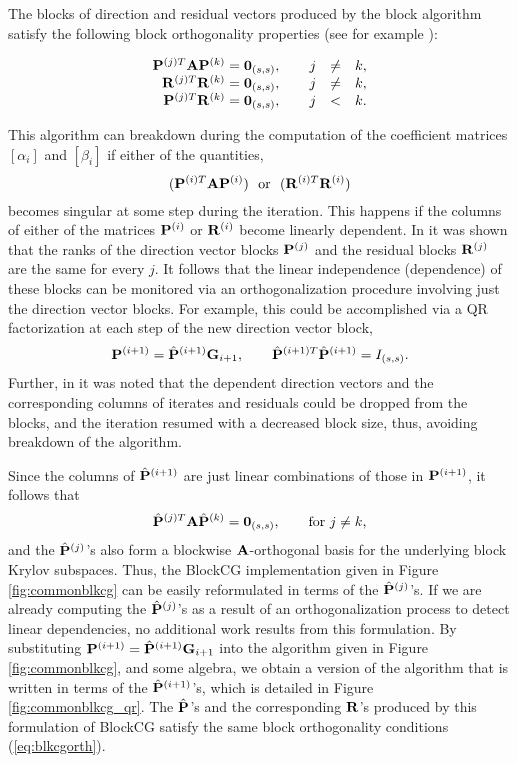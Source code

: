 \documentclass{article}
\newcommand{\bA}{{\bf A}}
\newcommand{\bG}{{\bf G}}
\newcommand{\bP}{{\bf P}}
\newcommand{\bR}{{\bf R}}
\newcommand{\dm}{\begin{displaymath}}
\newcommand{\edm}{\end{displaymath}}
\newcommand{\eq}{\begin{equation}}
\newcommand{\eeq}{\end{equation}}
\begin{document}
The blocks of direction and residual vectors produced by the block
algorithm satisfy the following block orthogonality properties
(see for example \cite{Ol80}):

 \eq
 \begin{array}{rcl}
  \bP^{(j)T} \bA \bP^{(k)} = {\bf 0}_{(s,s)}, \qquad j &\ne& k, \\
  \bR^{(j)T} \bR^{(k)} = {\bf 0}_{(s,s)}, \qquad j &\ne& k, \\
  \bP^{(j)T} \bR^{(k)} = {\bf 0}_{(s,s)}, \qquad j &<& k.
  \end{array}
  \label{eq:blkcgorth}
  \eeq

This algorithm can breakdown during the computation of the
coefficient matrices $[\alpha_i]$ and $[\beta_i]$ if either of the
quantities,
 \eq
 (\bP^{(i)T} \bA \bP^{(i)}) ~~{\rm or}~~ (\bR^{(i)T} \bR^{(i)})
 \label{eq:commonbd}
 \eeq
becomes singular at some step during the iteration. This happens
if the columns of either of the matrices $\bP^{(i)}$ or
$\bR^{(i)}$ become linearly dependent. In \cite{Ol80} it was shown
that the ranks of the direction vector blocks $\bP^{(j)}$ and the
residual blocks $\bR^{(j)}$ are the same for every $j$. It follows
that the linear independence (dependence) of these blocks can be
monitored via an orthogonalization procedure involving just the
direction vector blocks. For example, this could be accomplished
via a QR factorization at each step of the new direction vector
block,
  \dm
  \bP^{(i+1)} = {\hat \bP}^{(i+1)} \bG_{i+1}, \qquad {\hat \bP}^{(i+1)T}{\hat
  \bP}^{(i+1)}= I_{(s,s)}.
  \edm
Further, in \cite{Ol80} it was noted that the dependent direction
vectors and the corresponding columns of iterates and residuals
could be dropped from the blocks, and the iteration resumed with a
decreased block size, thus, avoiding breakdown of the algorithm.

Since the columns of ${\hat \bP}^{(i+1)}$ are just linear
combinations of those in $\bP^{(i+1)}$, it follows that
 \dm
  {\hat \bP}^{(j)T} \bA {\hat \bP}^{(k)} = {\bf 0}_{(s,s)}, \qquad {\rm for}~ j
  \ne k,
  \edm
and the ${\hat \bP}^{(j)}$'s also form a blockwise
$\bA$-orthogonal basis for the underlying block Krylov subspaces.
Thus, the BlockCG implementation given in Figure
\ref{fig:commonblkcg} can be easily reformulated in terms of the
${\hat \bP}^{(j)}$'s. If we are already computing the ${\hat
\bP}^{(j)}$'s as a result of an orthogonalization process to
detect linear dependencies, no additional work results from this
formulation. By substituting $\bP^{(i+1)} = {\hat \bP}^{(i+1)}
\bG_{i+1}$ into the algorithm given in Figure
\ref{fig:commonblkcg}, and some algebra, we obtain a version of
the algorithm that is written in terms of the ${\hat
\bP}^{(i+1)}$'s, which is detailed in Figure
\ref{fig:commonblkcg_qr}. The ${\hat \bP}$'s and the corresponding
$\bR$'s produced by this formulation of BlockCG satisfy the same
block orthogonality conditions (\ref{eq:blkcgorth}).
\end{document}
